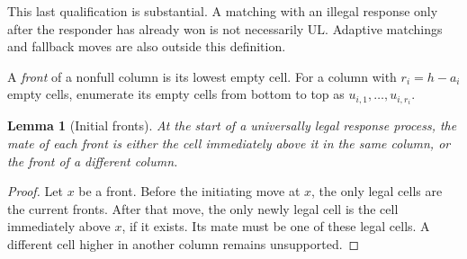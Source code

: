 \documentclass[11pt]{article}
\newtheorem{lemma}[theorem]{Lemma}
\theoremstyle{definition}
\theoremstyle{remark}
\newcommand{\UL}{\mathrm{UL}}
\begin{document}
This last qualification is substantial. A matching with an illegal response
only after the responder has already won is not necessarily $\UL$.
Adaptive matchings and fallback moves are also outside this definition.

A \emph{front} of a nonfull column is its lowest empty cell. For a column
with $r_i=h-a_i$ empty cells, enumerate its empty cells from bottom to top
as $u_{i,1},\ldots,u_{i,r_i}$.

\begin{lemma}[Initial fronts]\label{lem:fronts}
At the start of a universally legal response process, the mate of each
front is either the cell immediately above it in the same column, or the
front of a different column.
\end{lemma}
\begin{proof}
Let $x$ be a front. Before the initiating move at $x$, the only legal cells
are the current fronts. After that move, the only newly legal cell is the
cell immediately above $x$, if it exists. Its mate must be one of these
legal cells. A different cell higher in another column remains unsupported.
\end{proof}
\end{document}
